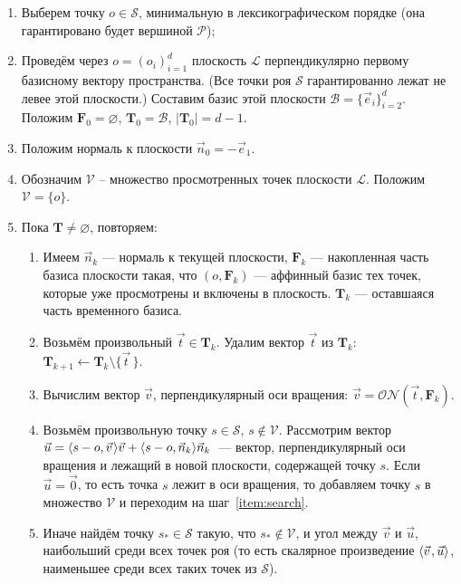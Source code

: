 \documentclass[a4paper,12pt]{article}
\newcommand{\Swarm}{\mathcal{S}}              %
\newcommand{\Polyhedron}{\mathcal{P}}         %
\newcommand{\Basis}{\mathcal{B}}              %
\newcommand{\Viewed}{\mathcal{V}}             %
\newcommand{\ZVec}{\vec 0}                    %
\newcommand{\set}[2][]{#1\{ #2 #1\}}                    %
\newcommand{\scalprod}[3][]{#1\langle #2, #3 #1\rangle} %
\newcommand{\ONorm}[3][]{\mathcal{ON}#1( #2, #3 #1)} %
\newcommand{\TempVec}{\mathbf{T}}  %
\newcommand{\FinalVec}{\mathbf{F}} %
\newcommand{\Plane}{\mathcal{L}}           %
\renewcommand{\.}{\hspace{0.2ex}}
\begin{document}
    \begin{enumerate}
      \item Выберем точку $o \in \Swarm$, минимальную в лексикографическом порядке (она гарантировано будет вершиной $\Polyhedron$);

      \item Проведём через $o=(o_i)_{i = 1}^{d}$ плоскость $\Plane$ перпендикулярно первому базисному вектору пространства. (Все точки роя $\Swarm$ гарантированно лежат не левее этой плоскости.) Составим базис этой плоскости $\Basis = \set{\vec e_i}_{i=2}^d$. Положим $\FinalVec_0 = \varnothing$, $\TempVec_0 = \Basis$, $|\TempVec_0| = d-1$.

      \item Положим нормаль к плоскости $\vec n_0 = -\vec e_1$.

      \item Обозначим $\Viewed$ -- множество просмотренных точек плоскости $\Plane$. Положим $\Viewed =\set{o}$.

      \item Пока $\TempVec \neq \varnothing$, повторяем:

      \begin{enumerate}
        \item Имеем $\vec n_k$ --- нормаль к текущей плоскости, $\FinalVec_k$ --- накопленная часть базиса плоскости такая, что $(o, \FinalVec_k)$ --- аффинный базис тех точек, которые уже просмотрены и включены в плоскость. $\TempVec_k$ --- оставшаяся часть временного базиса.

        \item Возьмём произвольный $\vec t \in \TempVec_k$. Удалим вектор $\vec t$ из $\TempVec_k$: $\TempVec_{k+1} \leftarrow \TempVec_k \setminus \set{\vec t \,}$.

        \item Вычислим вектор $\vec v$, перпендикулярный оси вращения: $\vec v = \ONorm{\vec t}{\FinalVec_k}$.

        \item Возьмём произвольную точку $s \in \Swarm$, $s \notin \Viewed$. Рассмотрим вектор $\vec u = \scalprod{s - o}{\vec v \.}\vec v + \scalprod{s - o}{\vec n_k}\vec n_k$~--- вектор, перпендикулярный оси вращения и лежащий в новой плоскости, содержащей точку $s$. Если $\vec u = \ZVec$, то есть точка $s$ лежит в оси вращения, то добавляем точку $s$ в множество $\Viewed$ и переходим на шаг~\ref{item:search}.
        \label{item:search}

        \item Иначе найдём точку $s_* \in \Swarm$ такую, что $s_* \notin \Viewed$, и угол между $\vec v$ и $\vec u$, наибольший среди всех точек роя (то есть скалярное произведение $\scalprod{\vec v \.}{\vec u}$, наименьшее среди всех таких точек из $\Swarm$).


\end{enumerate}
\end{enumerate}
\end{document}
